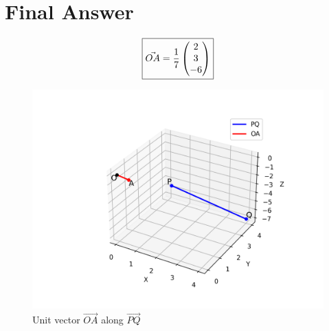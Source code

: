 \documentclass[12pt]{article}
\begin{document}
\section*{Final Answer}
\[
\boxed{\Vec{OA} = \frac{1}{7}\begin{pmatrix}2 \\ 3 \\ -6\end{pmatrix}}
\]

\begin{figure}[h!]
    \centering
    \includegraphics[width=0.6\linewidth]{figs/fig.png}
    \caption{Unit vector $\Vec{OA}$ along $\Vec{PQ}$}
\end{figure}
\end{document}
